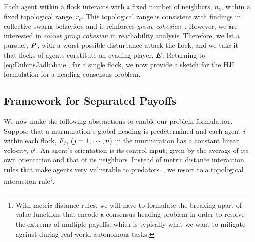 %
%
Each agent within a flock interacts with a fixed number of neighbors, $n_c$, within a fixed topological range, $r_c$. This topological range %
is consistent with findings in collective swarm behaviors and it reinforces \textit{group cohesion}~\cite{Ballerini1232}. However, we are interested in \textit{robust group cohesion} in reachability analysis. Therefore, we let a pursuer, $\bm{P}$, with a worst-possible disturbance attack the flock, and we take it that flocks of agents constitute an evading player, $\bm{E}$. 
%
%
Returning to \eqref{eq:DubinsJadbabaie}, for a single flock, we now provide a sketch for the HJI formulation for a heading consensus problem. 

\subsection{Framework for Separated Payoffs}
%
We now make the following abstractions to enable our problem formulation.
%
Suppose that a murmuration's global heading is predetermined and each agent $i$ within each flock, $F_j,\, (j=1, \cdots, n)$ in the murmuration has a constant linear velocity, $v^i$. An agent's orientation is its control input, given by the average of its own orientation and that of its neighbors. Instead of metric distance interaction rules that make agents very vulnerable to predators~\cite{Ballerini1232}, we resort to a topological interaction rule\footnote{With metric distance rules, we will have to formulate the breaking apart of value functions that encode a consensus heading problem in order to resolve the extrema of multiple payoffs; which is typically what we want to mitigate against during real-world autonomous tasks.}. 


